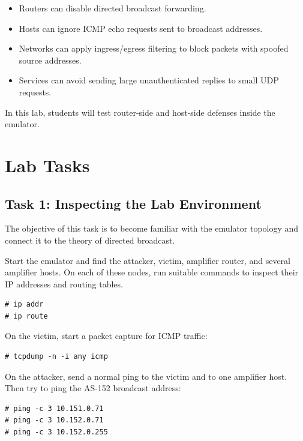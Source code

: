 \begin{itemize}[noitemsep]
\item Routers can disable directed broadcast forwarding.
\item Hosts can ignore ICMP echo requests sent to broadcast addresses.
\item Networks can apply ingress/egress filtering to block packets with spoofed
      source addresses.
\item Services can avoid sending large unauthenticated replies to small UDP
      requests.
\end{itemize}

In this lab, students will test router-side and host-side defenses inside the
emulator.


\section{Lab Tasks}

\subsection{Task 1: Inspecting the Lab Environment}

The objective of this task is to become familiar with the emulator topology and
connect it to the theory of directed broadcast.

Start the emulator and find the attacker, victim, amplifier router, and several
amplifier hosts. On each of these nodes, run suitable commands to inspect their
IP addresses and routing tables.

\begin{lstlisting}
# ip addr
# ip route
\end{lstlisting}

On the victim, start a packet capture for ICMP traffic:

\begin{lstlisting}
# tcpdump -n -i any icmp
\end{lstlisting}

On the attacker, send a normal ping to the victim and to one amplifier host.
Then try to ping the AS-152 broadcast address:

\begin{lstlisting}
# ping -c 3 10.151.0.71
# ping -c 3 10.152.0.71
# ping -c 3 10.152.0.255
\end{lstlisting}

